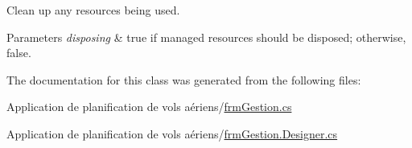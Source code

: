 Clean up any resources being used. 


\begin{DoxyParams}{Parameters}
{\em disposing} & true if managed resources should be disposed; otherwise, false.\\
\hline
\end{DoxyParams}


The documentation for this class was generated from the following files\+:\begin{DoxyCompactItemize}
\item 
Application de planification de vols aériens/\hyperlink{frm_gestion_8cs}{frm\+Gestion.\+cs}\item 
Application de planification de vols aériens/\hyperlink{frm_gestion_8_designer_8cs}{frm\+Gestion.\+Designer.\+cs}\end{DoxyCompactItemize}
